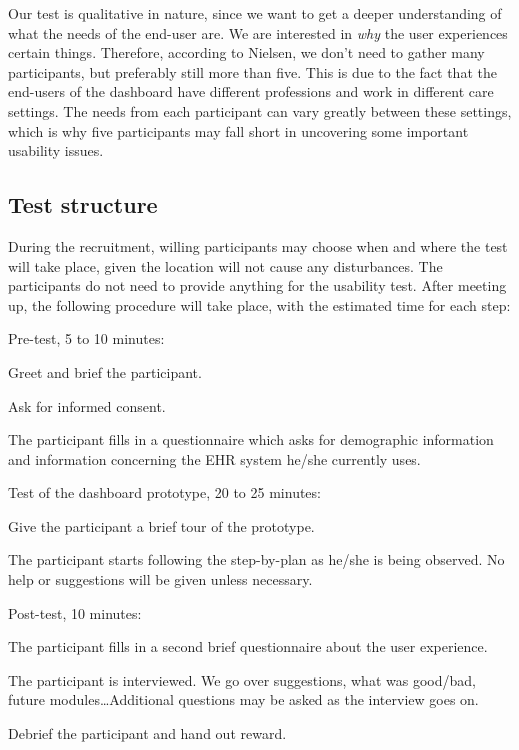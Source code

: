     Our test is qualitative in nature, since we want to get a deeper understanding of what the needs of the end-user are. We are interested in \emph{why} the user experiences certain things. Therefore, according to Nielsen, we don't need to gather many participants, but preferably still more than five. This is due to the fact that the end-users of the dashboard have different professions and work in different care settings. The needs from each participant can vary greatly between these settings, which is why five participants may fall short in uncovering some important usability issues.

    \subsection{Test structure}

    During the recruitment, willing participants may choose when and where the test will take place, given the location will not cause any disturbances. The participants do not need to provide anything for the usability test. After meeting up, the following procedure will take place, with the estimated time for each step:
    \begin{myenumerate}
        \item Pre-test, 5 to 10 minutes:
        \begin{myenumerate}
            \item Greet and brief the participant.
            \item Ask for informed consent.
            \item The participant fills in a questionnaire which asks for demographic information and information concerning the EHR system he/she currently uses.
        \end{myenumerate}
        \item Test of the dashboard prototype, 20 to 25 minutes:
        \begin{myenumerate}
            \item Give the participant a brief tour of the prototype.
            \item The participant starts following the step-by-plan as he/she is being observed. No help or suggestions will be given unless necessary.
        \end{myenumerate}
        \item Post-test, 10 minutes:
        \begin{myenumerate}
            \item The participant fills in a second brief questionnaire about the user experience.
            \item The participant is interviewed. We go over suggestions, what was good/bad, future modules\ldots Additional questions may be asked as the interview goes on.
            \item Debrief the participant and hand out reward.
        \end{myenumerate}
    \end{myenumerate}

